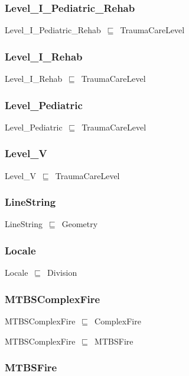 \documentclass{article}
\begin{document}
\subsubsection*{Level\_I\_Pediatric\_Rehab}

Level\_I\_Pediatric\_Rehab~\ensuremath{\sqsubseteq}~TraumaCareLevel~

\subsubsection*{Level\_I\_Rehab}

Level\_I\_Rehab~\ensuremath{\sqsubseteq}~TraumaCareLevel~

\subsubsection*{Level\_Pediatric}

Level\_Pediatric~\ensuremath{\sqsubseteq}~TraumaCareLevel~

\subsubsection*{Level\_V}

Level\_V~\ensuremath{\sqsubseteq}~TraumaCareLevel~

\subsubsection*{LineString}

LineString~\ensuremath{\sqsubseteq}~Geometry~

\subsubsection*{Locale}

Locale~\ensuremath{\sqsubseteq}~Division~

\subsubsection*{MTBSComplexFire}

MTBSComplexFire~\ensuremath{\sqsubseteq}~ComplexFire~

MTBSComplexFire~\ensuremath{\sqsubseteq}~MTBSFire~

\subsubsection*{MTBSFire}
\end{document}
